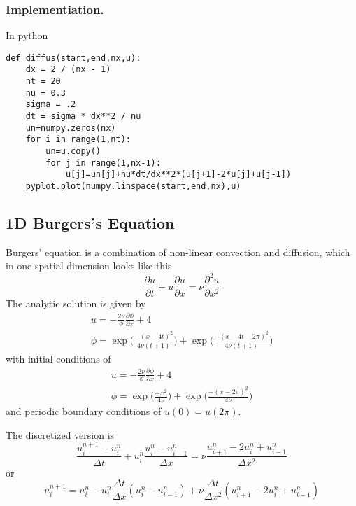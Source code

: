 \documentclass[../../../main.tex]{subfiles}
\begin{document}
\subsubsection*{Implementiation.}
In python
\begin{verbatim}
def diffus(start,end,nx,u):
    dx = 2 / (nx - 1)
    nt = 20    
    nu = 0.3   
    sigma = .2 
    dt = sigma * dx**2 / nu 
    un=numpy.zeros(nx)
    for i in range(1,nt):
        un=u.copy()
        for j in range(1,nx-1):
            u[j]=un[j]+nu*dt/dx**2*(u[j+1]-2*u[j]+u[j-1])
    pyplot.plot(numpy.linspace(start,end,nx),u)
\end{verbatim}

\subsection{1D Burgers's Equation}
Burgers' equation is a combination of non-linear convection and diffusion, which in one spatial dimension looks like this
\begin{equation*}
    \frac{\partial u}{\partial t} + u \frac{\partial u}{\partial x} = \nu \frac{\partial ^2u}{\partial x^2}
\end{equation*}
The analytic solution is given by 
\begin{gather*}
    u= -\frac{2 \nu}{\phi} \frac{\partial \phi}{\partial x} + 4 \\
    \phi = \exp \bigg(\frac{-(x-4t)^2}{4 \nu (t+1)} \bigg) + \exp \bigg(\frac{-(x-4t -2 \pi)^2}{4 \nu(t+1)} \bigg)
\end{gather*}
with initial conditions of 
\begin{gather*}
    u = -\frac{2 \nu}{\phi} \frac{\partial \phi}{\partial x} + 4 \\
    \phi = \exp \bigg(\frac{-x^2}{4 \nu} \bigg) + \exp \bigg(\frac{-(x-2 \pi)^2}{4 \nu} \bigg)
\end{gather*}
and periodic boundary conditions of $u(0)=u(2\pi)$.

The discretized version is 
\begin{equation*}
    \frac{u_i^{n+1}-u_i^n}{\Delta t} + u_i^n \frac{u_i^n - u_{i-1}^n}{\Delta x} = \nu \frac{u_{i+1}^n - 2u_i^n + u_{i-1}^n}{\Delta x^2}
\end{equation*}
or 
\begin{equation*}
    u_i^{n+1} = u_i^n - u_i^n \frac{\Delta t}{\Delta x} (u_i^n - u_{i-1}^n) + \nu \frac{\Delta t}{\Delta x^2}(u_{i+1}^n - 2u_i^n + u_{i-1}^n)
\end{equation*}
\end{document}
